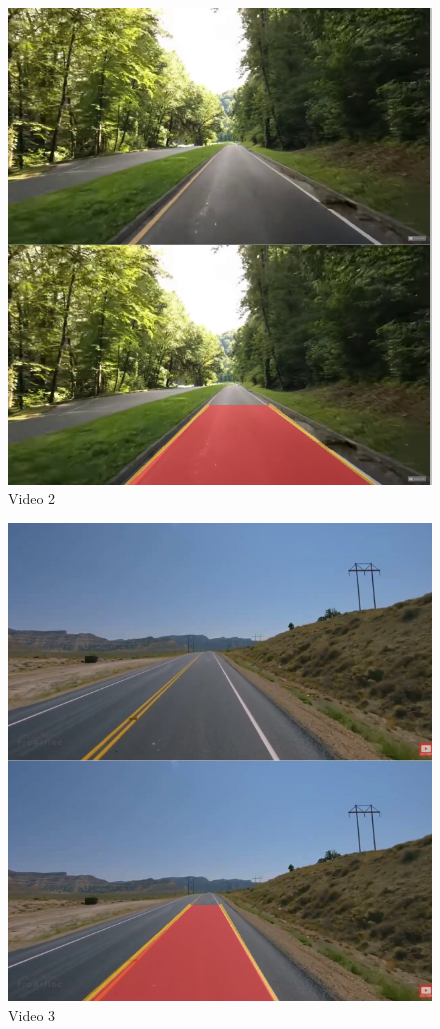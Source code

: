 \documentclass[12pt]{report}
\begin{document}
{\begin{figure}[h!]
    \centering
    \includegraphics[scale=0.4]{video6__01.png}
    \caption{Video 2}
    \label{fig:my_label2}
\end{figure}

\begin{figure}[h!]
    \centering
    \includegraphics[scale=0.4]{video7__01.png}
    \caption{Video 3}
    \label{fig:my_label2}
\end{figure}
\newpage

}
\end{document}
